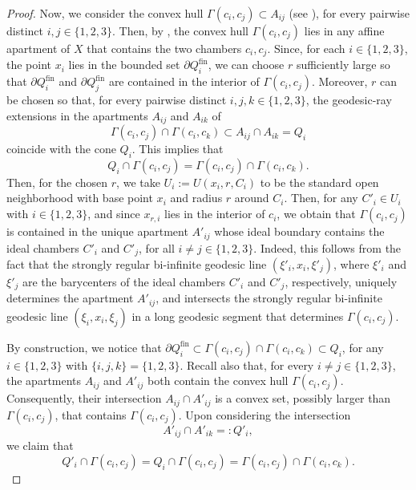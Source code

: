 \documentclass[11pt]{amsart}
\theoremstyle{plain}
\theoremstyle{definition}
\theoremstyle{remark}
\begin{document}
\begin{proof}
		Now, we consider the convex hull $\Gamma(c_i, c_j) \subset A_{ij}$ (see \cite[Definition 4.116]{abramenko_brown08}), for every pairwise distinct $i,j \in \{1,2,3\}$. Then, by \cite[the remarks after Definition 4.116]{abramenko_brown08}, the convex hull $\Gamma(c_i, c_j)$ lies in any affine apartment of $X$ that contains the two chambers $c_i, c_j$. Since, for each \(i \in \{1,2,3\}\), the point \(x_i\) lies in the bounded set \(\partial Q_i^{\mathrm{fin}}\), we can choose \(r\) sufficiently large so that \(\partial Q_i^{\mathrm{fin}}\) and \(\partial Q_j^{\mathrm{fin}}\) are contained in the interior of \(\Gamma(c_i,c_j)\). Moreover, \(r\) can be chosen so that, for every pairwise distinct \(i,j,k \in \{1,2,3\}\), the geodesic-ray extensions in the apartments \(A_{ij}\) and \(A_{ik}\) of \[ \Gamma(c_i,c_j)\cap\Gamma(c_i,c_k) \subset A_{ij}\cap A_{ik} = Q_i \] coincide with the cone \(Q_i\). This implies that
\begin{equation}
\label{equ::cone_in_apartment}
 Q_i\cap\Gamma(c_i,c_j) = \Gamma(c_i,c_j)\cap\Gamma(c_i,c_k).
\end{equation}
		Then, for the chosen $r$, we take $U_i:= U(x_i,r,C_i)$ to be the standard open neighborhood with base point $x_i$ and radius $r$ around $C_i$.  Then, for any $C'_i \in U_i$ with $i \in \{1,2,3\}$, and since $x_{r,i}$ lies in the interior of $c_i$, we obtain that $\Gamma(c_i, c_j)$ is contained in the unique apartment $A'_{ij}$ whose ideal boundary contains the ideal chambers $C'_i$ and $C'_j$, for all $i \neq j \in \{1,2,3\}$. Indeed, this follows from the fact that the strongly regular bi-infinite geodesic line $(\xi'_i, x_i, \xi'_j)$, where $\xi'_i$ and $\xi'_j$ are the barycenters of the ideal chambers $C'_i$ and $C'_j$, respectively, uniquely determines the apartment $A'_{ij}$, and intersects the strongly regular bi-infinite geodesic line $(\xi_i, x_i, \xi_j)$ in a long geodesic segment that determines $\Gamma(c_i, c_j)$. 
		
		By construction, we notice that $ \partial Q_i^{\mathrm{fin}}  \subset \Gamma(c_i, c_j)\cap \Gamma(c_i, c_k) \subset Q_i$, for any $i \in \{1,2,3\}$ with $\{i,j,k\}=\{1,2,3\}$. Recall also that, for every \(i \neq j \in \{1,2,3\}\), the apartments \(A_{ij}\) and \(A'_{ij}\) both contain the convex hull \(\Gamma(c_i,c_j)\). Consequently, their intersection \(A_{ij} \cap A'_{ij}\) is a convex set, possibly larger than \(\Gamma(c_i,c_j)\), that contains \(\Gamma(c_i,c_j)\). Upon considering the intersection \[ A'_{ij}\cap A'_{ik}=:Q'_i, \] we claim that 
		\[ Q'_i\cap\Gamma(c_i,c_j) = Q_i\cap\Gamma(c_i,c_j) = \Gamma(c_i,c_j)\cap\Gamma(c_i,c_k). \] 


\end{proof}
\end{document}
